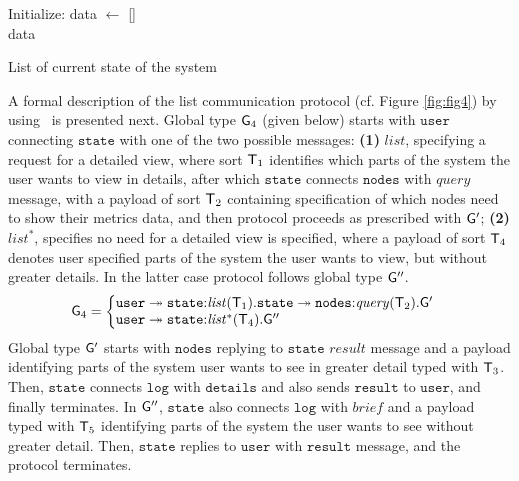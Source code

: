 \begin{algorithm}[H]
	\SetAlgoLined
	Initialize: data $\leftarrow$ []\\
	\Return data
	\caption{List of current state of the system}
	\label{alg:alg5}
\end{algorithm}

\noindent
A formal description of the list communication protocol (cf. Figure \ref{fig:fig4}) by using~\cite{HuY17} is presented next. Global type ${\sf G}_4$ (given below) starts with $\mathtt{user}$ connecting $\mathtt{state}$ with one of the two possible messages: 
\textbf{(1)} $\mathit{list}$, specifying a request for a detailed view, where sort ${\mathsf T}_1$ identifies which parts of the system the user wants to view in details, after which $\mathtt{state}$ connects $\mathtt{nodes}$ with $\mathit{query}$ message, with a payload of sort ${\mathsf T}_2$  containing specification of which nodes need to show their metrics data, and then protocol proceeds as prescribed with ${\sf G}'$; 
\textbf{(2)} $\mathit{list^*}$, specifies no need for a detailed view is specified, where a payload of sort ${\mathsf T}_4$ denotes user specified parts of the system the user wants to view, but without greater details. In the latter case protocol follows global type ${\sf G}''$.
\begin{align*}
\G_4 &= 
\left\{
\begin{array}{@{}l@{}}  
\mathtt{user} \twoheadrightarrow \mathtt{state}{:}\mathit{list}(\T_1).\mathtt{state}\twoheadrightarrow\mathtt{nodes}{:}\mathit{query}(\T_2). \G' \\
\mathtt{user} \twoheadrightarrow \mathtt{state}{:}\mathit{list^*}(\T_4).\G''
\end{array} \right.
\end{align*}
Global type ${\sf G}'$ starts with $\mathtt{nodes}$ replying to $\mathtt{state}$ $\mathit{result}$ message and a payload identifying parts of the system user wants to see in greater detail typed with ${\mathsf T}_3$. Then, $\mathtt{state}$ connects $\mathtt{log}$ with $\mathtt{details}$ and also sends $\mathtt{result}$ to $\mathtt{user}$, and finally terminates. 
In ${\sf G}''$, $\mathtt{state}$ also connects $\mathtt{log}$ with $\mathit{brief}$ and a payload typed with ${\mathsf T}_5$ identifying parts of the system the user wants to see without greater detail. Then, $\mathtt{state}$ replies to $\mathtt{user}$ with $\mathtt{result}$ message, and the protocol terminates.
